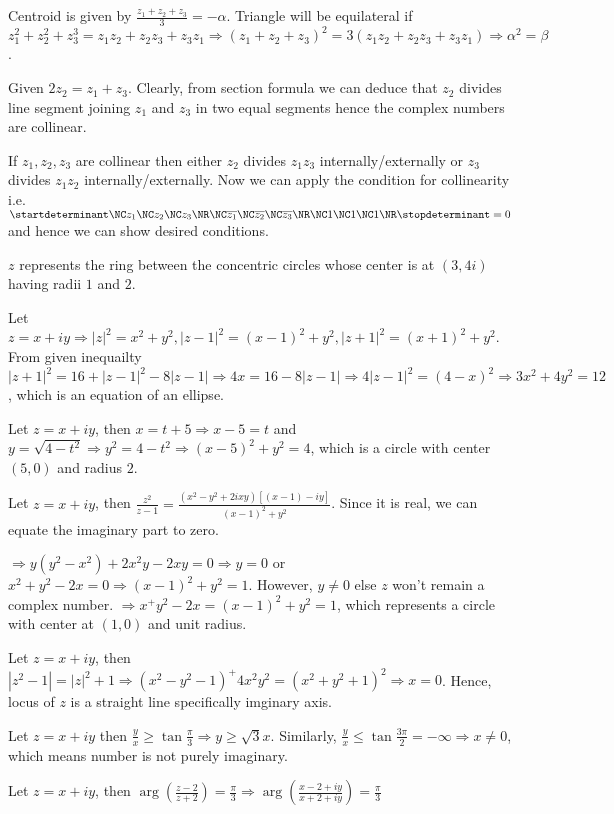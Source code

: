   Centroid is given by $\frac{z_1 + z_2 + z_3}{3} = -\alpha$. Triangle will be equilateral if $z_1^2 + z_2^2
  + z_3^3 = z_1z_2 + z_2z_3 + z_3z_1 \Rightarrow (z_1 + z_2 + z_3)^2 = 3(z_1z_2 + z_2z_3 + z_3z_1)
  \Rightarrow \alpha^2 = \beta$.
\item Given $2z_2 = z_1 + z_3$. Clearly, from section formula we can deduce that $z_2$ divides line segment
  joining $z_1$ and $z_3$ in two equal segments hence the complex numbers are collinear.
\item If $z_1, z_2, z_3$ are collinear then either $z_2$ divides $z_1z_3$ internally/externally or $z_3$
  divides $z_1z_2$ internally/externally. Now we can apply the condition for collinearity
  i.e. $\startdeterminant\NC z_1\NC z_2 \NC z_3\NR\NC \overline{z_1} \NC \overline{z_2} \NC
  \overline{z_3}\NR\NC 1\NC 1\NC 1\NR\stopdeterminant = 0$ and hence we can show desired conditions.
\item $z$ represents the ring between the concentric circles whose center is at $(3, 4i)$ having radii $1$
  and $2$.
\item Let $z = x + iy \Rightarrow |z|^2 = x^2 + y^2, |z - 1|^2 = (x - 1)^2 + y^2, |z + 1|^2 = (x + 1)^2 +
  y^2$. From given inequailty $|z + 1|^2 = 16 + |z - 1|^2 - 8|z - 1|\Rightarrow 4x = 16 - 8|z -
  1|\Rightarrow 4|z - 1|^2 = (4 - x)^2 \Rightarrow 3x^2 + 4y^2 = 12$, which is an equation of an ellipse.
\item Let $z = x + iy$, then $x = t + 5 \Rightarrow x - 5 = t$ and $y = \sqrt{4 - t^2}\Rightarrow y^2 = 4 -
  t^2 \Rightarrow (x - 5)^2 + y^2 = 4$, which is a circle with center $(5, 0)$ and radius $2$.
\item Let $z = x + iy$, then $\frac{z^2}{z - 1} = \frac{(x^2 - y^2 + 2ixy)[(x - 1) - iy]}{(x - 1)^2 +
  y^2}$. Since it is real, we can equate the imaginary part to zero.

  $\Rightarrow y(y^2 - x^2) + 2x^2y - 2xy = 0 \Rightarrow y = 0$ or $x^2 + y^2 - 2x = 0 \Rightarrow (x -
  1)^2 + y^2 = 1$. However, $y\neq 0$ else $z$ won't remain a complex number. $\Rightarrow x^ + y^2 - 2x =
  (x - 1)^2 + y^2 = 1$, which represents a circle with center at $(1, 0)$ and unit radius.
\item Let $z = x + iy$, then $|z^2 - 1| = |z|^2 + 1 \Rightarrow (x^2 - y^2 - 1)^ + 4x^2y^2 = (x^2 + y^2 +
  1)^2 \Rightarrow x = 0$. Hence, locus of $z$ is a straight line specifically imginary axis.
\item Let $z = x + iy$ then $\frac{y}{x} \geq \tan\frac{\pi}{3} \Rightarrow y\geq \sqrt{3}x$. Similarly,
  $\frac{y}{x} \leq \tan\frac{3\pi}{2}=-\infty \Rightarrow x\neq 0$, which means number is not purely
  imaginary.
\item Let $z = x + iy$, then $\arg\left(\frac{z - 2}{z + 2}\right) = \frac{\pi}{3} \Rightarrow
  \arg\left(\frac{x - 2 + iy}{x + 2 + iy}\right) = \frac{\pi}{3}$

